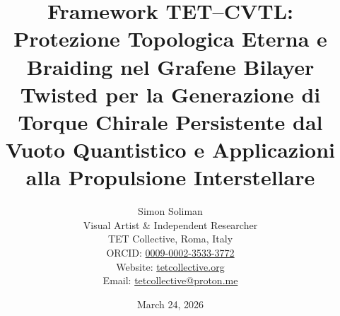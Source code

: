 \documentclass[11pt,a4paper]{article}
\theoremstyle{plain}
\theoremstyle{definition}
\begin{document}
\title{Framework TET–CVTL: Protezione Topologica Eterna e Braiding nel Grafene Bilayer Twisted per la Generazione di Torque Chirale Persistente dal Vuoto Quantistico e Applicazioni alla Propulsione Interstellare}





\author{Simon Soliman \\
Visual Artist \& Independent Researcher \\
TET Collective, Roma, Italy \\
ORCID: \href{https://orcid.org/0009-0002-3533-3772}{0009-0002-3533-3772} \\
Website: \href{https://tetcollective.org}{tetcollective.org} \\
Email: \href{mailto:tetcollective@proton.me}{tetcollective@proton.me}}


\date{March 24, 2026}




\maketitle
\end{document}
